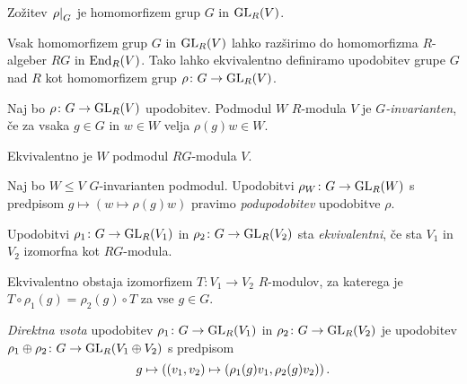 \begin{trditev}
Zožitev $\left. \rho\right|_{G}^{}$ je homomorfizem grup $G$ in $\operatorname{GL}_R(V)$.
\end{trditev}

\obvs

\begin{opomba}
Vsak homomorfizem grup $G$ in $\operatorname{GL}_R(V)$ lahko razširimo do
homomorfizma $R$-algeber $RG$ in $\operatorname{End}_R(V)$. Tako lahko
ekvivalentno definiramo upodobitev grupe $G$ nad $R$ kot
homomorfizem grup $\rho \colon G \to \operatorname{GL}_R(V)$.
\end{opomba}

\begin{definicija}
Naj bo $\rho \colon G \to \operatorname{GL}_R(V)$ upodobitev. Podmodul $W$
$R$-modula $V$ je \emph{$G$-invarianten}, če za vsaka $g \in G$ in
$w \in W$ velja $\rho(g) w \in W$.
\end{definicija}

\begin{opomba}
Ekvivalentno je $W$ podmodul $RG$-modula $V$.
\end{opomba}

\begin{definicija}
Naj bo $W \leq V$ $G$-invarianten podmodul. Upodobitvi
$\rho_W \colon G \to \operatorname{GL}_R(W)$ s predpisom
$g \mapsto (w \mapsto \rho(g) w)$ pravimo
\emph{podupodobitev} upodobitve
$\rho$.
\end{definicija}

\begin{definicija}
Upodobitvi $\rho_1 \colon G \to \operatorname{GL}_R(V_1)$ in
$\rho_2 \colon G \to \operatorname{GL}_R(V_2)$ sta
\emph{ekvivalentni}, če sta $V_1$ in
$V_2$ izomorfna kot $RG$-modula.
\end{definicija}

\begin{opomba}
Ekvivalentno obstaja izomorfizem $T \colon V_1 \to V_2$
$R$-modulov, za katerega je $T \circ \rho_1(g) = \rho_2(g) \circ T$
za vse $g \in G$.
\end{opomba}

\begin{definicija}
\emph{Direktna vsota} upodobitev
$\rho_1 \colon G \to \operatorname{GL}_R(V_1)$ in
$\rho_2 \colon G \to \operatorname{GL}_R(V_2)$ je upodobitev
$\rho_1 \oplus \rho_2 \colon G \to \operatorname{GL}_R(V_1 \oplus V_2)$ s
predpisom
\[
g \mapsto \left((v_1, v_2) \mapsto (\rho_1(g) v_1, \rho_2(g) v_2)\right).
\]
\end{definicija}

